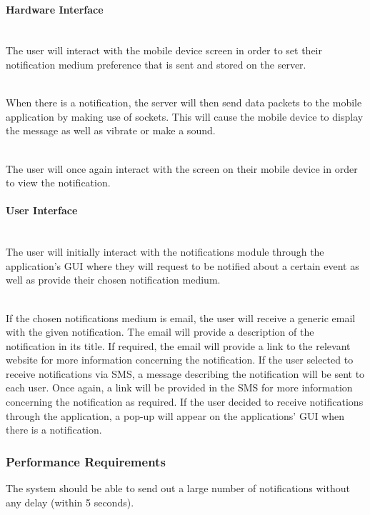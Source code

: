 \documentclass[runningheads,a4paper]{article}
\begin{document}
\paragraph{Hardware Interface}

\mbox{}\\
The user will interact with the mobile device screen in order to set their notification medium preference that is sent and stored on the server. 

\mbox{}\\
When there is a notification, the server will then send data packets to the mobile application by making use of sockets. This will cause the mobile device to display the message as well as vibrate or make a sound. 

\mbox{}\\
The user will once again interact with the screen on their mobile device in order to view the notification.

\paragraph{User Interface}
\mbox{}\\
The user will initially interact with the notifications module through the application’s GUI where they will request to be notified about a certain event as well as provide their chosen notification medium. 

\mbox{}\\
If the chosen notifications medium is email, the user will receive a generic email with the given notification. The email will provide a description of the notification in its title. If required, the email will provide a link to the relevant website for more information concerning the notification. If the user selected to receive notifications via SMS, a message describing the notification will be sent to each user. Once again, a link will be provided in the SMS for more information concerning the notification as required. If the user decided to receive notifications through the application, a pop-up will appear on the applications’ GUI when there is a notification. 

\subsubsection{Performance Requirements}

The system should be able to send out a large number of notifications without any delay (within 5 seconds).\\
\end{document}
